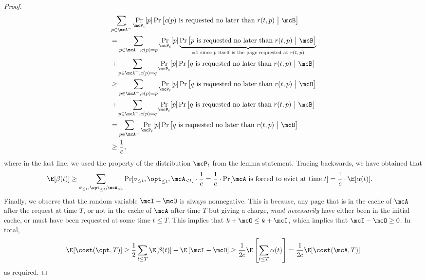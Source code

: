 \documentclass[11pt]{article}
\begin{document}
\begin{proof}
    \begingroup
    \allowdisplaybreaks
    \begin{align*}
        &\sum_{p \in \mcA^-}\Pr_{\mcP_t}[p] \Pr\left[\text{$c(p)$ is requested no later than $r(t,p)$}\ \big|\ \mcB\right] \\
        &= \sum_{p \in \mcA^-, c(p)=p}\Pr_{\mcP_t}[p]\underbrace{ \Pr\left[\text{$p$ is requested no later than $r(t,p)$}\ \big|\ \mcB\right]}_{=1\text{ since $p$ itself is the page requested at $r(t,p)$}} \\
        &+ \sum_{p \in \mcA^-, c(p)=q}\Pr_{\mcP_t}[p] \Pr\left[\text{$q$ is requested no later than $r(t,p)$}\ \big|\ \mcB\right] \\
        &\ge \sum_{p \in \mcA^-, c(p)=p}\Pr_{\mcP_t}[p] \Pr\left[\text{$q$ is requested no later than $r(t,p)$}\ \big|\ \mcB\right] \\
        &+ \sum_{p \in \mcA^-, c(p)=q}\Pr_{\mcP_t}[p] \Pr\left[\text{$q$ is requested no later than $r(t,p)$}\ \big|\ \mcB\right] \\
        &= \sum_{p \in \mcA^-}\Pr_{\mcP_t}[p] \Pr\left[\text{$q$ is requested no later than $r(t,p)$}\ \big|\ \mcB\right] \\
        &\ge \frac{1}{c},
    \end{align*}\endgroup
    where in the last line, we used the property of the distribution $\mcP_t$ from the lemma statement. Tracing backwards, we have obtained that
    \begin{align*}
        \E[\beta(t)] &\ge \sum_{\sigma_{\le t}, \opt_{\le t}, \mcA_{<t}} \Pr[\sigma_{\le t}, \opt_{\le t}, \mcA_{<t}] \cdot \frac{1}{c} = \frac{1}{c}\cdot \Pr[\text{$\mcA$ is forced to evict at time $t$}] = \frac{1}{c} \cdot \E[\alpha(t)].
    \end{align*}
    Finally, we observe that the random variable $\mcI-\mcO$ is always nonnegative. This is because, any page that is in the cache of $\mcA$ after the request at time $T$, or not in the cache of $\mcA$ after time $T$ but giving a charge, \textit{must necessarily} have either been in the initial cache, or must have been requested at some time $t \le T$. This implies that $k+\mcO \le k + \mcI$, which implies that $\mcI-\mcO \ge 0$. In total, 
    \begin{align*}
        \E[\cost(\opt, T)] \ge \frac12\sum_{t \le T}\E[\beta(t)] + \E\left[\mcI - \mcO\right]
        \ge \frac{1}{2c}\E\left[\sum_{t \le T}\alpha(t)\right] = \frac{1}{2c}\E[\cost(\mcA, T)]
    \end{align*}
    as required.    
\end{proof}
\end{document}
